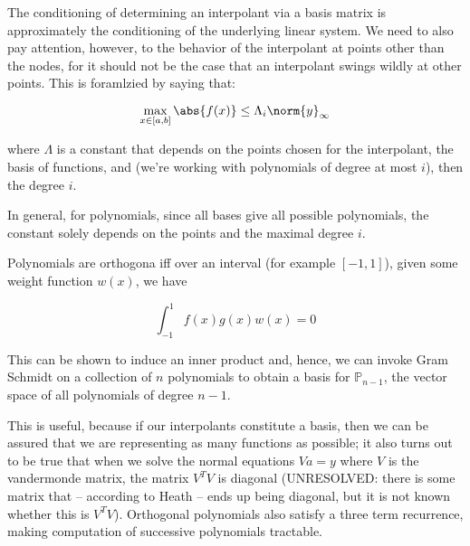 \documentclass[../main.tex]{subfiles}
\begin{document}
\begin{remark}
    The conditioning of determining an interpolant via a basis matrix is approximately the conditioning of the underlying linear system. We need to also pay attention, however, to the behavior of the interpolant at points other than the nodes, for it should not be the case that an interpolant swings wildly at other points. This is foramlzied by saying that:

    \[
        \max_{x \in [a,b]} \abs{f(x)} \leq \Lambda_i \norm{y}_{\infty}
    \]

    where $\Lambda$ is a constant that depends on the points chosen for the interpolant, the basis of functions, and (we're working with polynomials of degree at most $i$), then the degree $i$.

    In general, for polynomials, since all bases give all possible polynomials, the constant solely depends on the points and the maximal degree $i$.
\end{remark}


\begin{definition}
    Polynomials are orthogona iff over an interval (for example $[-1,1]$), given some
    weight function $w(x)$, we have

    \[
        \int_{-1}^{1} f(x) g(x) w(x) = 0
    \]

    This can be shown to induce an inner product and, hence, we can invoke Gram Schmidt
    on a collection of $n$ polynomials to obtain a basis for $\mathbb{P}_{n-1}$, the 
    vector space of all polynomials of degree $n-1$.
\end{definition}

\begin{remark}
    This is useful, because if our interpolants constitute a basis, then we can be assured that we are representing as many functions as possible; it also turns out to be true that
    when we solve the normal equations $V a = y$ where $V$ is the vandermonde matrix, the matrix $V^TV$ is diagonal (UNRESOLVED: there is some matrix that -- according to Heath -- ends up being diagonal, but it is not known whether this is $V^TV$). Orthogonal polynomials also satisfy a three term recurrence, making computation of successive polynomials tractable.
\end{remark}
\end{document}

